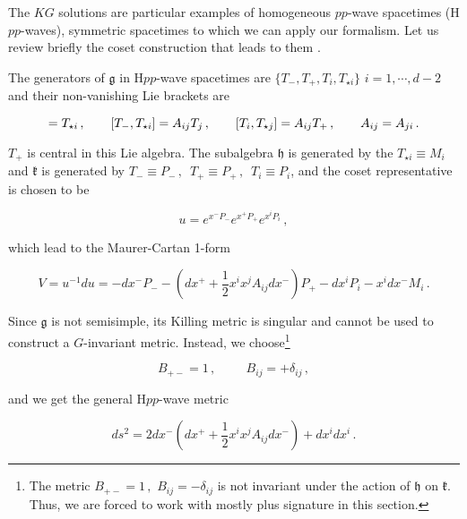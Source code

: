 \documentclass[12pt,a4paper]{article}
\begin{document}
The $KG$ solutions are particular examples of homogeneous $pp$-wave
spacetimes (H$pp$-waves), symmetric spacetimes to which we can apply
our formalism. Let us review briefly the coset construction that leads
to them \cite{kn:CaWa,Figueroa-O'Farrill:2001nz}.

The generators of $\mathfrak{g}$ in H$pp$-wave spacetimes are
$\{T_{-},T_{+},T_{i},T_{\star i}\}$ $i=1,\cdots,d-2$ and their
non-vanishing Lie brackets are

\begin{equation}
[T_{-},T_{i}]= T_{\star i}\, ,
\hspace{.7cm}  
[T_{-},T_{\star i}]= A_{ij}T_{j}\, ,
\hspace{.7cm}  
[T_{i},T_{\star j}] = A_{ij}T_{+}\, , 
\hspace{.7cm}  
A_{ij}=A_{ji}\, .
\end{equation}

$T_{+}$ is central in this Lie algebra.  The subalgebra $\mathfrak{h}$
is generated by the $T_{\star i}\equiv M_{i}$ and $\mathfrak{k}$ is
generated by $T_{-}\equiv P_{-}\, ,\,\,\, T_{+}\equiv P_{+}\, ,\,\,\,
T_{i}\equiv P_{i}$, and the coset representative is chosen to be

\begin{equation}
u = e^{x^{-}P_{-}}e^{x^{+}P_{+}}e^{x^{i}P_{i}}\, ,  
\end{equation}

\noindent
which lead to the Maurer-Cartan 1-form

\begin{equation}
V = u^{-1}du = -dx^{-}P_{-} 
-(dx^{+} +{\textstyle{\frac{1}{2}}}x^{i}x^{j}A_{ij}dx^{-})P_{+} 
-dx^{i}P_{i}
-x^{i}dx^{-}M_{i}\, .
\end{equation}

Since $\mathfrak{g}$ is not semisimple, its Killing metric is singular
and cannot be used to construct a $G$-invariant metric. Instead, we
choose\footnote{The metric $B_{+-}=1\, ,\,\,B_{ij}= -\delta_{ij}$ is
  not invariant under the action of $\mathfrak{h}$ on $\mathfrak{k}$.
  Thus, we are forced to work with mostly plus signature in this
  section.}

\begin{equation}
B_{+-}=1\, ,
\hspace{1cm}
B_{ij}= +\delta_{ij}\, ,
\end{equation}

\noindent
and we get the general H$pp$-wave metric

\begin{equation}
ds^{2} = 2dx^{-}(dx^{+} +{\textstyle{\frac{1}{2}}}x^{i}x^{j}A_{ij}dx^{-})
+dx^{i}dx^{i}\, .  
\end{equation}
\end{document}
